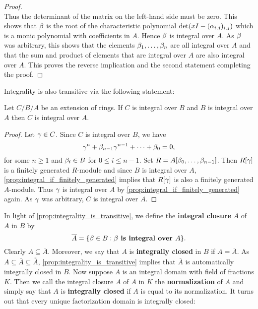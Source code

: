 \begin{proof}
\[      \]
      Thus the determinant of the matrix on the left-hand side must be zero. This shows that $\beta$ is the root of the characteristic polynomial $\det(xI-(\alpha_{i,j})_{i,j})$ which is a monic polynomial with coefficients in $A$. Hence $\beta$ is integral over $A$. As $\beta$ was arbitrary, this shows that the elements $\beta_{1},\ldots,\beta_{n}$ are all integral over $A$ and that the sum and product of elements that are integral over $A$ are also integral over $A$. This proves the reverse implication and the second statement completing the proof.
    \end{proof}

    Integrality is also transitive via the following statement:

    \begin{proposition}\label{prop:integrality_is_transitive}
      Let $C/B/A$ be an extension of rings. If $C$ is integral over $B$ and $B$ is integral over $A$ then $C$ is integral over $A$.
    \end{proposition}
    \begin{proof}
      Let $\gamma \in C$. Since $C$ is integral over $B$, we have
      \[
        \gamma^{n}+\beta_{n-1}\gamma^{n-1}+\cdots+\beta_{0} = 0,
      \]
      for some $n \ge 1$ and $\beta_{i} \in B$ for $0 \le i \le n-1$. Set $R = A[\beta_{0},\ldots,\beta_{n-1}]$. Then $R[\gamma]$ is a finitely generated $R$-module and since $B$ is integral over $A$, \cref{prop:integral_if_finitely_generated} implies that $R[\gamma]$ is also a finitely generated $A$-module. Thus $\gamma$ is integral over $A$ by \cref{prop:integral_if_finitely_generated} again. As $\gamma$ was arbitrary, $C$ is integral over $A$.
    \end{proof}

    In light of \cref{prop:integrality_is_transitive}, we define the \textbf{integral closure} $\overline{A}$ of $A$ in $B$ by
    \[
      \overline{A} = \{\beta \in B:\textbf{$\beta$ is integral over $A$}\}.
    \]
    Clearly $A \subseteq \overline{A}$. Moreover, we say that $A$ is \textbf{integrally closed} in $B$ if $A = \overline{A}$. As $A \subseteq \overline{A} \subseteq \overline{\overline{A}}$, \cref{prop:integrality_is_transitive} implies that $\overline{A}$ is automatically integrally closed in $B$. Now suppose $A$ is an integral domain with field of fractions $K$. Then we call the integral closure $\overline{A}$ of $A$ in $K$ the \textbf{normalization} of $A$ and simply say that $A$ is \textbf{integrally closed} if $A$ is equal to its normalization. It turns out that every unique factorization domain is integrally closed:

